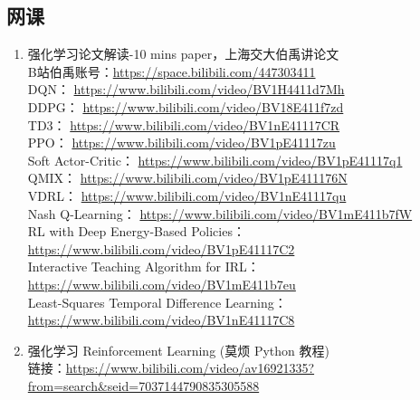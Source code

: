 \documentclass[lang=cn,11pt,a4paper]{eleganttemplate}
\begin{document}
\subsection{网课}
\begin{enumerate}
    \item 强化学习论文解读-10 mins paper，上海交大伯禹讲论文 \\
    B站伯禹账号：\href{https://space.bilibili.com/447303411}{https://space.bilibili.com/447303411}  \\
    DQN： \href{https://www.bilibili.com/video/BV1H4411d7Mh}{https://www.bilibili.com/video/BV1H4411d7Mh}  \\
    DDPG： \href{https://www.bilibili.com/video/BV18E411f7zd}{https://www.bilibili.com/video/BV18E411f7zd}  \\
    TD3： \href{https://www.bilibili.com/video/BV1nE41117CR}{https://www.bilibili.com/video/BV1nE41117CR}  \\
    PPO： \href{https://www.bilibili.com/video/BV1pE41117zu}{https://www.bilibili.com/video/BV1pE41117zu}  \\
    Soft Actor-Critic： \href{https://www.bilibili.com/video/BV1pE41117q1}{https://www.bilibili.com/video/BV1pE41117q1}  \\
    QMIX： \href{https://www.bilibili.com/video/BV1pE411176N}{https://www.bilibili.com/video/BV1pE411176N}  \\
    VDRL： \href{https://www.bilibili.com/video/BV1nE41117qu}{https://www.bilibili.com/video/BV1nE41117qu}  \\
    Nash Q-Learning： \href{https://www.bilibili.com/video/BV1mE411b7fW}{https://www.bilibili.com/video/BV1mE411b7fW}  \\
    RL with Deep Energy-Based Policies： \href{https://www.bilibili.com/video/BV1pE41117C2}{https://www.bilibili.com/video/BV1pE41117C2}  \\
    Interactive Teaching Algorithm for IRL： \href{https://www.bilibili.com/video/BV1mE411b7eu}{ https://www.bilibili.com/video/BV1mE411b7eu} \\
    Least-Squares Temporal Difference Learning： \href{https://www.bilibili.com/video/BV1nE41117C8}{https://www.bilibili.com/video/BV1nE41117C8}
    \item 强化学习 Reinforcement Learning (莫烦 Python 教程) \\
    链接：\href{https://www.bilibili.com/video/av16921335?from=search&seid=7037144790835305588}{https://www.bilibili.com/video/av16921335?from=search\&seid=7037144790835305588} \\

\end{enumerate}
\end{document}
